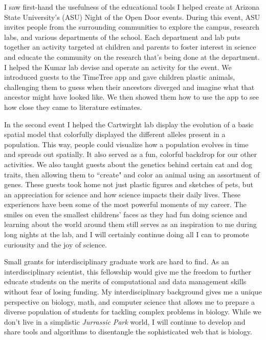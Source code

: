 \documentclass[12pt]{article}
\begin{document}

I saw first-hand the usefulness of the educational tools I helped create at Arizona State University's (ASU)
Night of the Open Door events. During this event, ASU invites people from the surrounding communities to explore the campus, research labs, and various departments of the school. Each department and lab puts together an activity targeted at children and parents to foster interest in science and educate the community on the research that's being done at the department. I helped the Kumar lab devise and operate an activity for the event. We introduced guests to the TimeTree app and gave children plastic animals, challenging them to guess when their ancestors diverged and imagine what that ancestor might have looked like. We then showed them how to use the app to see how close they came to literature estimates.

In the second event I helped the Cartwirght lab display the evolution of a basic spatial model that colorfully displayed the different alleles present in a population. This way, people could visualize how a population evolves in time and spreads out spatially. It also served as a fun, colorful backdrop for our other activities. We also taught guests about the genetics behind certain cat and dog traits, then allowing them to ``create" and color an animal using an assortment of genes. These guests took home not just plastic figures and sketches of pets, but an appreciation for science and how science impacts their daily lives. These experiences have been some of the most powerful moments of my career. The smiles on even the smallest childrens' faces as they had fun doing science and learning about the world around them still serves as an inspiration to me during long nights at the lab, and I will certainly continue doing all I can to promote curiousity and the joy of science.

Small grants for interdisciplinary graduate work are hard to find.
As an interdisciplinary scientist, this fellowship would give me the freedom to further educate students on the merits of computational and data management skills without fear of losing funding. My interdisciplinary background gives me a unique perspective on biology, math, and computer science that allows me to prepare a diverse population of students for tackling complex problems in biology.
While we don't live in a simplistic \textit{Jurrassic Park} world, I will continue to develop and share tools and algorithms to disentangle the sophisticated web that is biology.
\end{document}

